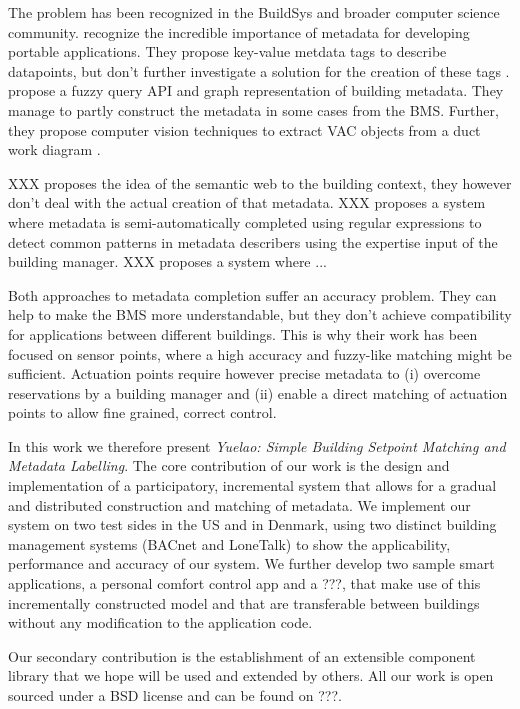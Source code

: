 The problem has been recognized in the BuildSys and broader computer science community.
\citeauthor{Dawson-haggerty2013} recognize the incredible importance of metadata for developing portable applications. They propose key-value metdata tags to describe datapoints, but don't further investigate a solution for the creation of these tags \cite{Dawson-haggerty2013}.
\citeauthor{Krioukov2012} propose a fuzzy query API and graph representation of building metadata. They manage to partly construct the metadata in some cases from the BMS.
Further, they propose computer vision techniques to extract VAC objects from a duct work diagram \cite{Krioukov2012}. 

XXX proposes the idea of the semantic web to the building context, they however don't deal with the actual creation of that metadata. 
XXX proposes a system where metadata is semi-automatically completed using regular expressions to detect common patterns in metadata describers using the expertise input of the building manager. 
XXX proposes a system where ... 

Both approaches to metadata completion suffer an accuracy problem. They can help to make the BMS more understandable, but they don't achieve compatibility for applications between different buildings. This is why their work has been focused on sensor points, where a high accuracy and fuzzy-like matching might be sufficient.
Actuation points require however precise metadata to (i) overcome reservations by a building manager and (ii) enable a direct matching of actuation points to allow fine grained, correct control.

In this work we therefore present \emph{Yuelao: Simple Building Setpoint Matching and Metadata Labelling}.
The core contribution of our work is the design and implementation of a participatory, incremental system that allows for a gradual and distributed construction and matching of metadata.
We implement our system on two test sides in the US and in Denmark, using two distinct building management systems (BACnet and LoneTalk) to show the applicability, performance and accuracy of our system.
We further develop two sample smart applications, a personal comfort control app and a ???,  that make use of this incrementally constructed model and that are transferable between buildings without any modification to the application code.

Our secondary contribution is the establishment of an extensible component library that we hope will be used and extended by others.
All our work is open sourced under a BSD license and can be found on ???.

